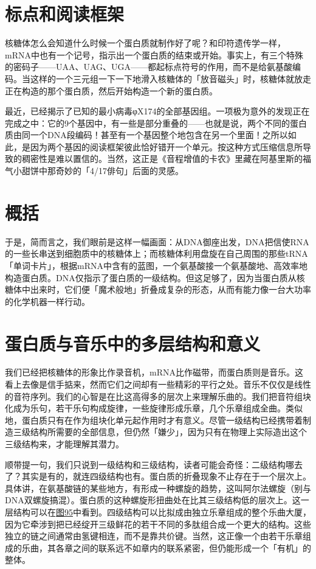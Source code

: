 \documentclass[
  12pt,
  twoside,
  openright,
  oldfontcommands,
]{memoir}
\begin{document}
\section{标点和阅读框架}

核糖体怎么会知道什么时候一个蛋白质就制作好了呢？和印符遗传学一样，mRNA中也有一个记号，指示出一个蛋白质的结束或开始。事实上，有三个特殊的密码子------UAA、UAG、UGA------都起标点符号的作用，而不是给氨基酸编码。当这样的一个三元组一下一下地滑入核糖体的「放音磁头」时，核糖体就放走正在构造的那个蛋白质，然后开始构造一个新的蛋白质。

最近，已经揭示了已知的最小病毒φX174的全部基因组。一项极为意外的发现正在完成之中：它的9个基因中，有一些是部分重叠的------也就是说，两个不同的蛋白质由同一个DNA段编码！甚至有一个基因整个地包含在另一个里面！之所以如此，是因为两个基因的阅读框架彼此恰好错开一个单元。按这种方式压缩信息所导致的稠密性是难以置信的。当然，这正是《音程增值的卡农》里藏在阿基里斯的福气小甜饼中那奇妙的「4/17俳句」后面的灵感。

\section{概括}

于是，简而言之，我们眼前是这样一幅画面：从DNA御座出发，DNA把信使RNA的一些长串送到细胞质中的核糖体上；而核糖体利用盘旋在自己周围的那些tRNA「单词卡片」，根据mRNA中含有的蓝图，一个氨基酸接一个氨基酸地、高效率地构造蛋白质。DNA仅指示了蛋白质的一级结构。但这足够了，因为当蛋白质从核糖体中出来时，它们便「魔术般地」折叠成复杂的形态，从而有能力像一台大功率的化学机器一样行动。

\section{蛋白质与音乐中的多层结构和意义}

我们已经把核糖体的形象比作录音机，mRNA比作磁带，而蛋白质则是音乐。这看上去像是信手掂来，然而它们之间却有一些精彩的平行之处。音乐不仅仅是线性的音符序列。我们的心智是在比这高得多的层次上来理解乐曲的。我们把音符组块化成为乐句，若干乐句构成旋律，一些旋律形成乐章，几个乐章组成全曲。类似地，蛋白质只有在作为组块化单元起作用时才有意义。尽管一级结构已经携带着制造三级结构所需要的全部信息，但仍然「嫌少」，因为只有在物理上实际造出这个三级结构来，才能理解其潜力。

顺带提一句，我们只说到一级结构和三级结构，读者可能会奇怪：二级结构哪去了？其实是有的，就连四级结构也有。蛋白质的折叠现象不止存在于一个层次上。具体讲，在氨基酸链的某些地方，有形成一种螺旋的趋势，这叫阿尔法螺旋（别与DNA双螺旋搞混）。蛋白质的这种螺旋形扭曲处在比其三级结构低的层次上。这一层结构可以在\hyperref[fig:95]{图95}中看到。四级结构可以比拟成由独立乐章组成的整个乐曲大厦，因为它牵涉到把已经绽开三级鲜花的若干不同的多肽组合成一个更大的结构。这些独立的链之间通常由氢键相连，而不是靠共价键。当然，这正像一个由若干乐章组成的乐曲，其各章之间的联系远不如章内的联系紧密，但仍能形成一个「有机」的整体。
\end{document}
